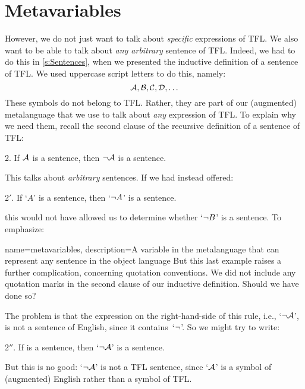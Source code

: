 \section{Metavariables}\label{s:Metavariables}
However, we do not just want to talk about \emph{specific} expressions of TFL. We also want to be able to talk about \emph{any arbitrary} sentence of TFL. Indeed, we had to do this in \cref{s:Sentences}, when we presented the inductive definition of a sentence of TFL. We used uppercase script letters to do this, namely:
	$$\mathcal{A}, \mathcal{B}, \mathcal{C}, \mathcal{D}, \ldots$$
These symbols do not belong to TFL. Rather, they are part of our (augmented) metalanguage that we use to talk about \emph{any} expression of TFL. To explain why we need them, recall the second clause of the recursive definition of a sentence of TFL:
	\begin{compactlist}
		\item[2.] If $\mathcal{A}$ is a sentence, then $\neg \mathcal{A}$ is a sentence.
	\end{compactlist}
This talks about \emph{arbitrary} sentences. If we had instead offered:
	\begin{compactlist}
		\item[2$'$.] If `$A$' is a sentence, then `$\neg A$' is a sentence.
	\end{compactlist}
this would not have allowed us to determine whether `$\neg B$' is a sentence. To emphasize:

{
name=metavariables,
description={A variable in the metalanguage that can represent any sentence in the object language}
}
But this last example raises a further complication, concerning quotation conventions. We did not include any quotation marks in the second clause of our inductive definition. Should we have done so?

The problem is that the expression on the right-hand-side of this rule, i.e., `$\neg\mathcal{A}$', is not a sentence of English, since it contains~`$\neg$'. So we might try to write:
	\begin{numberlist}
		\item[2$''$.] If  is a sentence, then `$\neg \mathcal{A}$' is a sentence.
	\end{numberlist}
But this is no good: `$\neg \mathcal{A}$' is not a TFL sentence, since `$\mathcal{A}$' is a symbol of (augmented) English rather than a symbol of TFL.

